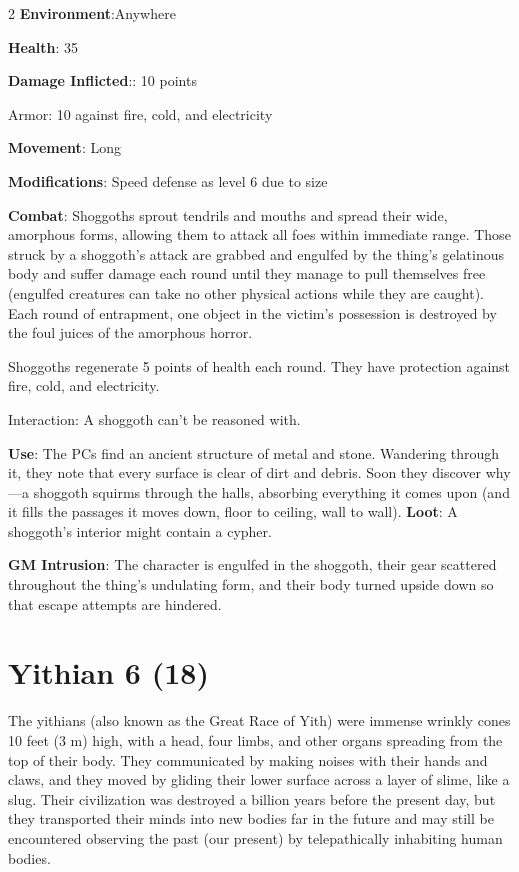 \begin{multicols}{2}
\textbf{Environment}:Anywhere

\textbf{Health}: 35

\textbf{Damage Inflicted}:: 10 points

Armor: 10 against fire, cold, and electricity 

\textbf{Movement}: Long

\textbf{Modifications}: Speed defense as level 6 due to size 

\textbf{Combat}: Shoggoths sprout tendrils and mouths and spread their wide, amorphous forms, allowing them to attack all foes within immediate range. Those struck by a shoggoth’s attack are grabbed and engulfed by the thing’s gelatinous body and suffer damage each round until they manage to pull themselves free (engulfed creatures can take no other physical actions while they are caught). Each round of entrapment, one object in the victim’s possession is destroyed by the foul juices of the amorphous horror.

Shoggoths regenerate 5 points of health each round. They have protection against fire, cold, and electricity.

Interaction: A shoggoth can’t be reasoned with. 

\textbf{Use}: The PCs find an ancient structure of metal and stone. Wandering through it, they note that every surface is clear of dirt and debris. Soon they discover why—a shoggoth squirms through the halls, absorbing everything it comes upon (and it fills the passages it moves down, floor to ceiling, wall to wall).
\textbf{Loot}: A shoggoth’s interior might contain a cypher.

\textbf{GM Intrusion}: The character is engulfed in the shoggoth, their gear scattered throughout the thing’s undulating form, and their body turned upside down so that escape attempts are hindered.

\section{Yithian 6 (18)}

The yithians (also known as the Great Race of Yith) were immense wrinkly cones 10 feet (3 m) high, with a head, four limbs, and other organs spreading from the top of their body. They communicated by making noises with their hands and claws, and they moved by gliding their lower surface across a layer of slime, like a slug. Their civilization was destroyed a billion years before the present day, but they transported their minds into new bodies far in the future and may still be encountered observing the past (our present) by telepathically inhabiting human bodies.


\end{multicols}
